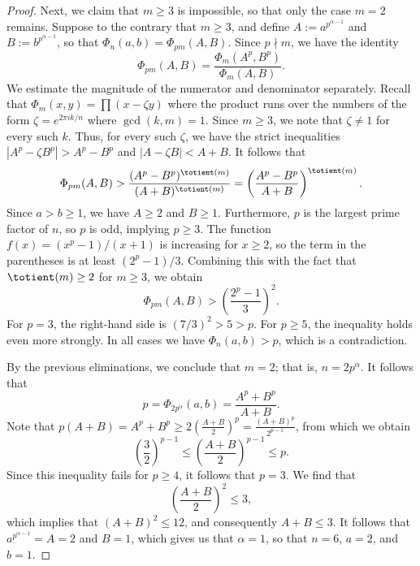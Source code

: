 \begin{proof}
  Next, we claim that $m\geq 3$ is impossible, so that only the case $m=2$ remains. Suppose to the contrary that $m\geq 3$, and define $A:=a^{p^{\alpha-1}}$ and $B:=b^{p^{\alpha-1}}$, so that $\Phi_n(a,b)=\Phi_{pm}(A,B)$. Since $p\nmid m$, we have the identity
  \begin{equation*}
    \Phi_{pm}(A,B) = \frac{\Phi_m(A^p, B^p)}{\Phi_m(A, B)}.
  \end{equation*}
  We estimate the magnitude of the numerator and denominator separately. Recall that $\Phi_m(x,y)=\prod (x-\zeta y)$ where the product runs over the numbers of the form $\zeta=e^{2\pi ik/n}$ where $\gcd(k,m)=1$. Since $m\geq 3$, we note that $\zeta\neq 1$ for every such $k$. Thus, for every such $\zeta$, we have the strict inequalities $|A^p-\zeta B^p| > A^p-B^p$ and $|A-\zeta B| < A+B$. It follows that
  \begin{equation*}
    \Phi_{pm}(A,B) > \frac{(A^p-B^p)^{\totient(m)}}{(A+B)^{\totient(m)}} = \left( \frac{A^p-B^p}{A+B} \right)^{\totient(m)}.
  \end{equation*}
  Since $a>b\geq 1$, we have $A\geq 2$ and $B\geq 1$. Furthermore, $p$ is the largest prime factor of $n$, so $p$ is odd, implying $p\geq 3$. The function $f(x) = (x^p-1)/(x+1)$ is increasing for $x\geq 2$, so the term in the parentheses is at least $(2^p-1)/3$. Combining this with the fact that $\totient(m)\geq 2$ for $m\geq 3$, we obtain
  \begin{equation*}
    \Phi_{pm}(A,B) > \left( \frac{2^p-1}{3} \right)^2.
  \end{equation*}
  For $p=3$, the right-hand side is $(7/3)^2 > 5 > p$. For $p\geq 5$, the inequality holds even more strongly. In all cases we have $\Phi_n(a,b) > p$, which is a contradiction.

  By the previous eliminations, we conclude that $m=2$; that is, $n=2p^\alpha$. It follows that
  \begin{equation*}
    p=\Phi_{2p^\alpha}(a,b)=\frac{A^p+B^p}{A+B}.
  \end{equation*}
  Note that $p(A+B)=A^p+B^p\geq 2(\frac{A+B}{2})^p=\frac{(A+B)^p}{2^{p-1}}$, from which we obtain
  \begin{equation*}
    \left(\frac{3}{2}\right)^{p-1}\leq \left(\frac{A+B}{2}\right)^{p-1}\leq p.
  \end{equation*}
  Since this inequality fails for $p\geq 4$, it follows that $p=3$. We find that
  \begin{equation*}
    \left(\frac{A+B}{2}\right)^{2}\leq 3,
  \end{equation*}
  which implies that $(A+B)^2\leq 12$, and consequently $A+B\leq 3$. It follows that $a^{p^{\alpha-1}}=A=2$ and $B=1$, which gives us that $\alpha=1$, so that $n=6$, $a=2$, and $b=1$.
\end{proof}

